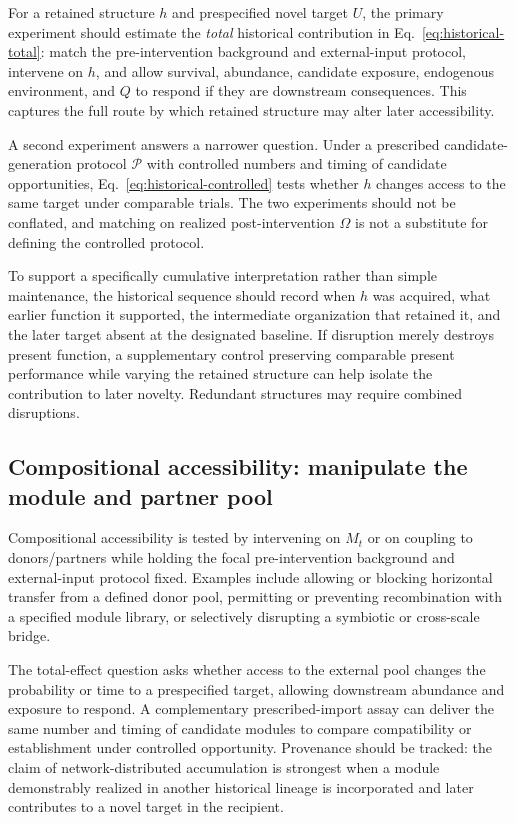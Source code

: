 \documentclass[11pt,a4paper]{article}
\begin{document}
For a retained structure $h$ and prespecified novel target $U$, the primary experiment should estimate the \emph{total} historical contribution in Eq.~\eqref{eq:historical-total}: match the pre-intervention background and external-input protocol, intervene on $h$, and allow survival, abundance, candidate exposure, endogenous environment, and $Q$ to respond if they are downstream consequences. This captures the full route by which retained structure may alter later accessibility.

A second experiment answers a narrower question. Under a prescribed candidate-generation protocol $\mathcal P$ with controlled numbers and timing of candidate opportunities, Eq.~\eqref{eq:historical-controlled} tests whether $h$ changes access to the same target under comparable trials. The two experiments should not be conflated, and matching on realized post-intervention $\Omega$ is not a substitute for defining the controlled protocol.

To support a specifically cumulative interpretation rather than simple maintenance, the historical sequence should record when $h$ was acquired, what earlier function it supported, the intermediate organization that retained it, and the later target absent at the designated baseline. If disruption merely destroys present function, a supplementary control preserving comparable present performance while varying the retained structure can help isolate the contribution to later novelty. Redundant structures may require combined disruptions.

\subsection{Compositional accessibility: manipulate the module and partner pool}

Compositional accessibility is tested by intervening on $M_t$ or on coupling to donors/partners while holding the focal pre-intervention background and external-input protocol fixed. Examples include allowing or blocking horizontal transfer from a defined donor pool, permitting or preventing recombination with a specified module library, or selectively disrupting a symbiotic or cross-scale bridge.

The total-effect question asks whether access to the external pool changes the probability or time to a prespecified target, allowing downstream abundance and exposure to respond. A complementary prescribed-import assay can deliver the same number and timing of candidate modules to compare compatibility or establishment under controlled opportunity. Provenance should be tracked: the claim of network-distributed accumulation is strongest when a module demonstrably realized in another historical lineage is incorporated and later contributes to a novel target in the recipient.
\end{document}
